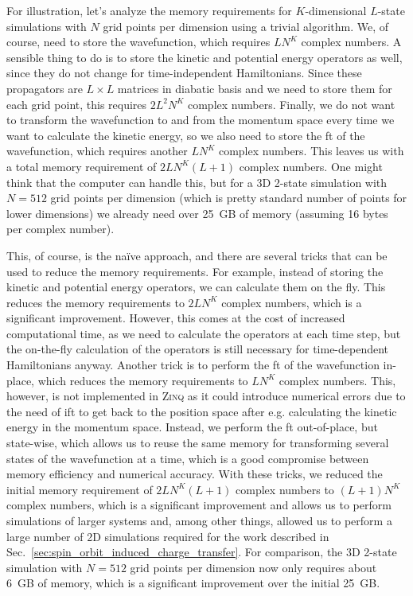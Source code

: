 For illustration, let's analyze the memory requirements for $K$-dimensional $L$-state simulations with $N$ grid points per dimension using a trivial algorithm. We, of course, need to store the wavefunction, which requires $LN^K$ complex numbers. A sensible thing to do is to store the kinetic and potential energy operators as well, since they do not change for time-independent Hamiltonians. Since these propagators are $L\times L$ matrices in diabatic basis and we need to store them for each grid point, this requires $2L^2N^K$ complex numbers. Finally, we do not want to transform the wavefunction to and from the momentum space every time we want to calculate the kinetic energy, so we also need to store the \acrfull{ft} of the wavefunction, which requires another $LN^K$ complex numbers. This leaves us with a total memory requirement of $2LN^K(L+1)$ complex numbers. One might think that the computer can handle this, but for a 3D 2-state simulation with $N=512$ grid points per dimension (which is pretty standard number of points for lower dimensions) we already need over 25~GB of memory (assuming 16 bytes per complex number).

This, of course, is the na\"ive approach, and there are several tricks that can be used to reduce the memory requirements. For example, instead of storing the kinetic and potential energy operators, we can calculate them on the fly. This reduces the memory requirements to $2LN^K$ complex numbers, which is a significant improvement. However, this comes at the cost of increased computational time, as we need to calculate the operators at each time step, but the on-the-fly calculation of the operators is still necessary for time-dependent Hamiltonians anyway. Another trick is to perform the \acrshort{ft} of the wavefunction in-place, which reduces the memory requirements to $LN^K$ complex numbers. This, however, is not implemented in \textsc{Zinq} as it could introduce numerical errors due to the need of \acrfull{ift} to get back to the position space after e.g. calculating the kinetic energy in the momentum space. Instead, we perform the \acrshort{ft} out-of-place, but state-wise, which allows us to reuse the same memory for transforming several states of the wavefunction at a time, which is a good compromise between memory efficiency and numerical accuracy. With these tricks, we reduced the initial memory requirement of $2LN^K(L+1)$ complex numbers to $(L+1)N^K$ complex numbers, which is a significant improvement and allows us to perform simulations of larger systems and, among other things, allowed us to perform a large number of 2D simulations required for the work described in Sec.~\ref{sec:spin_orbit_induced_charge_transfer}. For comparison, the 3D 2-state simulation with $N=512$ grid points per dimension now only requires about 6~GB of memory, which is a significant improvement over the initial 25~GB.

